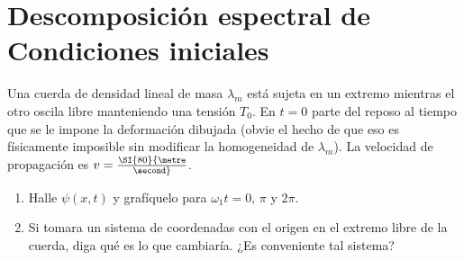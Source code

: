 \section*{Descomposición espectral de Condiciones iniciales}

\item
\begin{minipage}[t][2.3cm]{0.6\textwidth}
Una cuerda de densidad lineal de masa $\lambda_m$ está sujeta en un extremo mientras el otro oscila libre manteniendo una tensión $T_{0}$.
En $t = 0$ parte del reposo al tiempo que se le impone la deformación dibujada (obvie el hecho de que eso es físicamente imposible sin modificar la homogeneidad de $\lambda_m$).
La velocidad de propagación es \(v = \SI{80}{\metre\over\second} \).
\end{minipage}
\begin{minipage}[c][0.4cm][t]{0.34\textwidth}
\end{minipage}
\begin{enumerate}
	\item Halle $\psi(x,t)$ y grafíquelo para $\omega_1 t = 0,\,\pi$ y $2\pi$.
	\item Si tomara un sistema de coordenadas con el origen en el extremo libre de la cuerda, diga qué es lo que cambiaría.
	¿Es conveniente tal sistema?
\end{enumerate}





